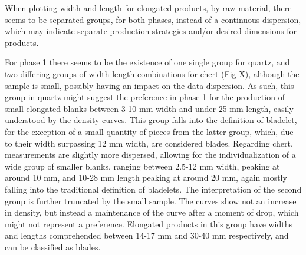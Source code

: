 \documentclass[12pt,twoside]{reedthesis}
\begin{document}
When plotting width and length for elongated products, by raw material, there seems to be separated groups, for both phases, instead of a continuous dispersion, which may indicate separate production strategies and/or desired dimensions for products.

For phase 1 there seems to be the existence of one single group for quartz, and two differing groups of width-length combinations for chert (Fig X), although the sample is small, possibly having an impact on the data dispersion. As such, this group in quartz might suggest the preference in phase 1 for the production of small elongated blanks between 3-10 mm width and under 25 mm length, easily understood by the density curves. This group falls into the definition of bladelet, for the exception of a small quantity of pieces from the latter group, which, due to their width surpassing 12 mm width, are considered blades. Regarding chert, measurements are slightly more dispersed, allowing for the individualization of a wide group of smaller blanks, ranging between 2.5-12 mm width, peaking at around 10 mm, and 10-28 mm length peaking at around 20 mm, again mostly falling into the traditional definition of bladelets. The interpretation of the second group is further truncated by the small sample. The curves show not an increase in density, but instead a maintenance of the curve after a moment of drop, which might not represent a preference. Elongated products in this group have widths and lengths comprehended between 14-17 mm and 30-40 mm respectively, and can be classified as blades.
\end{document}
